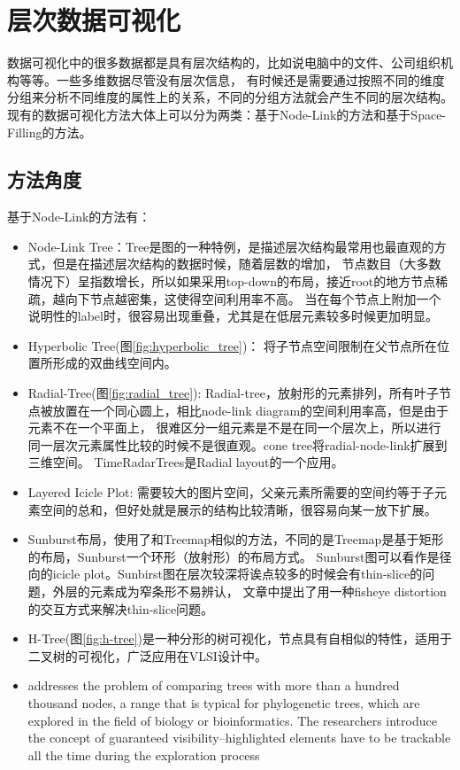 \documentclass{article}
\begin{document}
\normalem
\section{层次数据可视化}
数据可视化中的很多数据都是具有层次结构的，比如说电脑中的文件、公司组织机构等等。一些多维数据尽管没有层次信息，
有时候还是需要通过按照不同的维度分组来分析不同维度的属性上的关系，不同的分组方法就会产生不同的层次结构。
现有的数据可视化方法大体上可以分为两类：基于Node-Link的方法和基于Space-Filling的方法。
\subsection{方法角度}
基于Node-Link的方法有：
\begin{itemize}
	\item Node-Link Tree：Tree是图的一种特例，是描述层次结构最常用也最直观的方式，但是在描述层次结构的数据时候，随着层数的增加，
		节点数目（大多数情况下）呈指数增长，所以如果采用top-down的布局，接近root的地方节点稀疏，越向下节点越密集，这使得空间利用率不高。
		当在每个节点上附加一个说明性的label时，很容易出现重叠，尤其是在低层元素较多时候更加明显。

	\item Hyperbolic Tree(图\ref{fig:hyperbolic_tree})： 将子节点空间限制在父节点所在位置所形成的双曲线空间内。

	\item Radial-Tree(图\ref{fig:radial_tree}):
		Radial-tree，放射形的元素排列，所有叶子节点被放置在一个同心圆上，相比node-link diagram的空间利用率高，但是由于元素不在一个平面上，
		很难区分一组元素是不是在同一个层次上，所以进行同一层次元素属性比较的时候不是很直观。cone tree将radial-node-link扩展到三维空间。
		TimeRadarTrees\cite{Burch2011TimeRadar}是Radial layout的一个应用。

	\item Layered Icicle Plot:
		需要较大的图片空间，父亲元素所需要的空间约等于子元素空间的总和，但好处就是展示的结构比较清晰，很容易向某一放下扩展。

	\item Sunburst布局，使用了和Treemap相似的方法，不同的是Treemap是基于矩形的布局，Sunburst一个环形（放射形）的布局方式。
		Sunburst图可以看作是径向的icicle plot。Sunbirst图在层次较深将诶点较多的时候会有thin-slice的问题，外层的元素成为窄条形不易辨认，
		文章中提出了用一种fisheye distortion的交互方式来解决thin-slice问题。

	\item H-Tree(图\ref{fig:h-tree})是一种分形的树可视化，节点具有自相似的特性，适用于二叉树的可视化，广泛应用在VLSI设计中\cite{browning1980tree}。

	\item \cite{munzner2003treejuxtaposer}addresses the problem of comparing
		trees with more than a hundred thousand nodes, a range that is typical for phylogenetic trees,
		which are explored in the field of biology or bioinformatics.
		The researchers introduce the concept of guaranteed visibility--highlighted elements have
		to be trackable all the time during the exploration process

\end{itemize}
\end{document}
